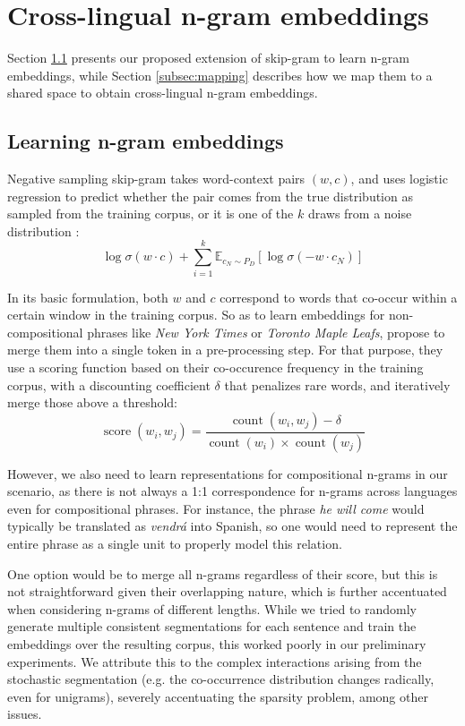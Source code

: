 \documentclass[11pt,a4paper]{article}
\DeclareMathOperator{\countop}{count}
\DeclareMathOperator{\score}{score}
\begin{document}
\section{Cross-lingual n-gram embeddings} \label{sec:embeddings}

Section \ref{subsec:phrase_embeddings} presents our proposed extension of skip-gram to learn n-gram embeddings, while Section \ref{subsec:mapping} describes how we map them to a shared space to obtain cross-lingual n-gram embeddings.

\subsection{Learning n-gram embeddings} \label{subsec:phrase_embeddings}
Negative sampling skip-gram takes word-context pairs $(w,c)$, and uses logistic regression to predict whether the pair comes from the true distribution as sampled from the training corpus, or it is one of the $k$ draws from a noise distribution \citep{mikolov2013distributed}:
\[ \log \sigma \left( w \cdot c \right) + \sum_{i=1}^k \mathbb{E}_{c_N \sim P_D} \left[ \log \sigma \left( -w \cdot c_N \right) \right] \]

In its basic formulation, both $w$ and $c$ correspond to words that co-occur within a certain window in the training corpus. So as to learn embeddings for non-compositional phrases like \textit{New York Times} or \textit{Toronto Maple Leafs}, \citet{mikolov2013distributed} propose to merge them into a single token in a pre-processing step. For that purpose, they use a  scoring function based on their co-occurence frequency in the training corpus, with a discounting coefficient $\delta$ that penalizes rare words, and iteratively merge those above a threshold:
\[ \score(w_i, w_j) = \frac{\countop \left( w_i, w_j \right) - \delta}{\countop \left( w_i \right) \times \countop \left( w_j \right)} \]

However, we also need to learn representations for compositional n-grams in our scenario, as there is not always a 1:1 correspondence for n-grams across languages even for compositional phrases.
For instance, the phrase \textit{he will come} would typically be translated as \textit{vendr\'{a}} into Spanish, so one would need to represent the entire phrase as a single unit to properly model this relation. 

One option would be to merge all n-grams regardless of their score, but this is not straightforward given their overlapping nature, which is further accentuated when considering n-grams of different lengths. While we tried to randomly generate multiple consistent segmentations for each sentence and train the embeddings over the resulting corpus, this worked poorly in our preliminary experiments. We attribute this to the complex interactions arising from the stochastic segmentation (e.g. the co-occurrence distribution changes radically, even for unigrams), severely accentuating the sparsity problem, among other issues.
\end{document}
